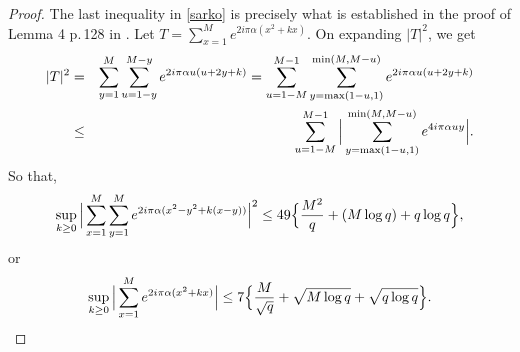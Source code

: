 \documentclass[11pt,draft,reqno]{amsart}
\theoremstyle{definition}
\theoremstyle{remarks}
\numberwithin{equation}{section}
\def \a{{\alpha}}
\begin{document}
\begin{proof}  The last inequality in \eqref{sarko} is precisely what is established in the proof of Lemma 4 p.\,128 in \cite{Sa}.
Let $T=\sum_{x=1}^M e^{2i\pi
\a (x^2 +kx)}$. On expanding $|T|^2$, we get
\begin{eqnarray*}|T|^2  &=&
\sum_{y=1}^M\sum_{u=1-y}^{M-y} e^{2i\pi \a u(u+2y+  k )} =\sum_{u=1-M}^{M-1}\sum_{y=\max(1-u,1) }^{\min(M,M-u)}  e^{2i\pi \a u(u+2y+  k )}
\cr &\le &
\sum_{u=1-M}^{M-1}\Big|\sum_{y=\max(1-u,1) }^{\min(M,M-u)}  e^{4i\pi \a   uy }\Big|.
\end{eqnarray*}So that,
$$\sup_{k\ge 0}\Big|\sum_{x=1}^M\sum_{y=1}^M e^{2i\pi \a (x^2-y^2 +k(x-y))}\Big|^2\le 49
\Big\{{M^2\over  q}+(M\log q) + q\log q \Big\},$$
or
$$\sup_{k\ge 0}\Big|\sum_{x=1}^M e^{2i\pi
\a (x^2 +kx)}\Big| \le 7
\Big\{{M \over  \sqrt q}+\sqrt{ M\log q} + \sqrt{q\log q} \Big\}.$$
\end{proof}

 
\end{document}
